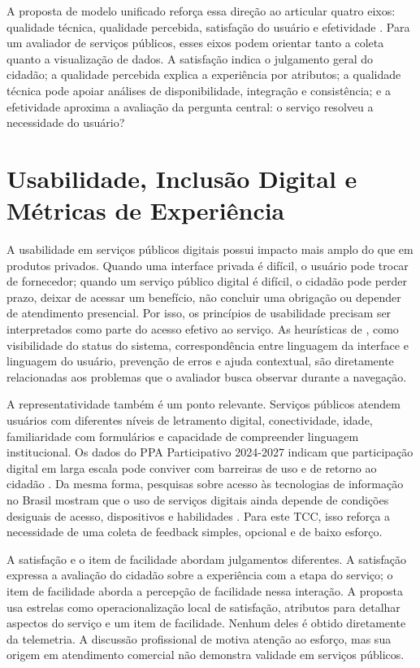 A proposta de modelo unificado reforça essa direção ao articular quatro eixos: qualidade técnica, qualidade percebida, satisfação do usuário e efetividade \cite{silva2022}. Para um avaliador de serviços públicos, esses eixos podem orientar tanto a coleta quanto a visualização de dados. A satisfação indica o julgamento geral do cidadão; a qualidade percebida explica a experiência por atributos; a qualidade técnica pode apoiar análises de disponibilidade, integração e consistência; e a efetividade aproxima a avaliação da pergunta central: o serviço resolveu a necessidade do usuário?

\section{Usabilidade, Inclusão Digital e Métricas de Experiência}
\label{sec:2.7}

A usabilidade em serviços públicos digitais possui impacto mais amplo do que em produtos privados. Quando uma interface privada é difícil, o usuário pode trocar de fornecedor; quando um serviço público digital é difícil, o cidadão pode perder prazo, deixar de acessar um benefício, não concluir uma obrigação ou depender de atendimento presencial. Por isso, os princípios de usabilidade precisam ser interpretados como parte do acesso efetivo ao serviço. As heurísticas de , como visibilidade do status do sistema, correspondência entre linguagem da interface e linguagem do usuário, prevenção de erros e ajuda contextual, são diretamente relacionadas aos problemas que o avaliador busca observar durante a navegação.

A representatividade também é um ponto relevante. Serviços públicos atendem usuários com diferentes níveis de letramento digital, conectividade, idade, familiaridade com formulários e capacidade de compreender linguagem institucional. Os dados do PPA Participativo 2024-2027 indicam que participação digital em larga escala pode conviver com barreiras de uso e de retorno ao cidadão \cite{mgi2024}. Da mesma forma, pesquisas sobre acesso às tecnologias de informação no Brasil mostram que o uso de serviços digitais ainda depende de condições desiguais de acesso, dispositivos e habilidades \cite{cgi2025}. Para este TCC, isso reforça a necessidade de uma coleta de feedback simples, opcional e de baixo esforço.

A satisfação e o item de facilidade abordam julgamentos diferentes. A satisfação expressa a avaliação do cidadão sobre a experiência com a etapa do serviço; o item de facilidade aborda a percepção de facilidade nessa interação. A proposta usa estrelas como operacionalização local de satisfação, atributos para detalhar aspectos do serviço e um item de facilidade. Nenhum deles é obtido diretamente da telemetria. A discussão profissional de  motiva atenção ao esforço, mas sua origem em atendimento comercial não demonstra validade em serviços públicos.

